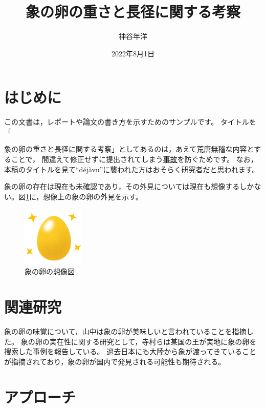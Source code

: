 \documentclass[dvipdfmx]{jsarticle}
\begin{document}
\title{象の卵の重さと長径に関する考察}
\author{神谷年洋}
\date{2022年8月1日}
\maketitle

\section{はじめに}

この文書は，レポートや論文の書き方を示すためのサンプルです。
タイトルを「{象の卵の重さと長径に関する考察」としてあるのは，あえて荒唐無稽な内容とすることで，
間違えて修正せずに提出されてしまう\href{https://twitter.com/taku_ymnk/status/392959147974471681?s=20&t=3p7I92WEGvoPpj_7d-dtyA}{事故}を防ぐためです。 %
なお，本稿のタイトルを見て``d\'{e}j\`{a}vu''に襲われた方はおそらく研究者だと思われます。 %

象の卵の存在は現在も未確認であり，その外見については現在も想像するしかない。図\ref{fig:golden_egg}に，想像上の象の卵の外見を示す。 %

\begin{figure}[htp]
\centering
\includegraphics[width=3cm]{golden_egg.png}
\caption{象の卵の想像図}
\label{fig:golden_egg} %
\end{figure}

\section{関連研究}
\label{sec:related} %

象の卵の味覚について，山中\cite{kakenhi_latex}は象の卵が美味しいと言われていることを指摘した。 %
象の卵の実在性に関する研究として，寺村ら\cite{teramura2009}は某国の王が実地に象の卵を捜索した事例を報告している。
過去日本にも大陸から象が渡ってきていることが指摘\cite{kamei1990}されており，象の卵が国内で発見される可能性も期待される。

\section{アプローチ}

}
\end{document}

